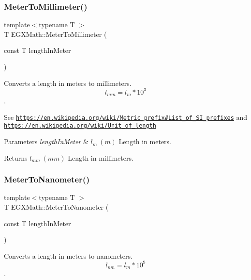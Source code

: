 \subsubsection{\texorpdfstring{Meter\+To\+Millimeter()}{MeterToMillimeter()}}
{\footnotesize\ttfamily template$<$typename T $>$ \\
T E\+G\+X\+Math\+::\+Meter\+To\+Millimeter (\begin{DoxyParamCaption}\item[{const T}]{length\+In\+Meter }\end{DoxyParamCaption})}



Converts a length in meters to millimeters. \[ l_{mm}=l_{m} * 10^{3} \]. 

See \href{https://en.wikipedia.org/wiki/Metric_prefix#List_of_SI_prefixes}{\tt https\+://en.\+wikipedia.\+org/wiki/\+Metric\+\_\+prefix\#\+List\+\_\+of\+\_\+\+S\+I\+\_\+prefixes} and \href{https://en.wikipedia.org/wiki/Unit_of_length}{\tt https\+://en.\+wikipedia.\+org/wiki/\+Unit\+\_\+of\+\_\+length} 
\begin{DoxyParams}{Parameters}
{\em length\+In\+Meter} & $ l_{m}\ (m)$ Length in meters. \\
\hline
\end{DoxyParams}
\begin{DoxyReturn}{Returns}
$ l_{mm}\ (mm)$ Length in millimeters. 
\end{DoxyReturn}
\mbox{\label{group___e_g_x_math-_conversions-_length_conversions-_meter-_s_i_gad3532cd9d0a9b97ae34aadc0eea27c57}} 
\subsubsection{\texorpdfstring{Meter\+To\+Nanometer()}{MeterToNanometer()}}
{\footnotesize\ttfamily template$<$typename T $>$ \\
T E\+G\+X\+Math\+::\+Meter\+To\+Nanometer (\begin{DoxyParamCaption}\item[{const T}]{length\+In\+Meter }\end{DoxyParamCaption})}



Converts a length in meters to nanometers. \[ l_{nm}=l_{m} * 10^{9} \]. 

